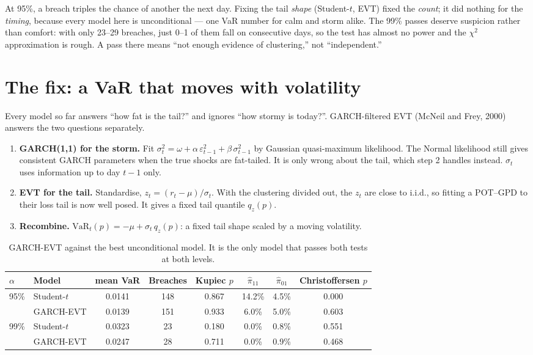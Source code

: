 \documentclass[11pt]{article}
\begin{document}
\noindent At 95\%, a breach triples the chance of another the next day. Fixing
the tail \emph{shape} (Student-$t$, EVT) fixed the \emph{count}; it did nothing
for the \emph{timing}, because every model here is unconditional --- one VaR
number for calm and storm alike. The 99\% passes deserve suspicion rather than
comfort: with only 23--29 breaches, just 0--1 of them fall on consecutive days,
so the test has almost no power and the $\chi^2$ approximation is rough. A pass
there means ``not enough evidence of clustering,'' not ``independent.''

\section{The fix: a VaR that moves with volatility}
Every model so far answers ``how fat is the tail?'' and ignores ``how stormy
is today?''. GARCH-filtered EVT (McNeil and Frey, 2000) answers the two
questions separately.
\begin{enumerate}[nosep,leftmargin=1.6em]
  \item \textbf{GARCH(1,1) for the storm.} Fit
        $\sigma_t^2=\omega+\alpha\,\varepsilon_{t-1}^2+\beta\,\sigma_{t-1}^2$
        by Gaussian quasi-maximum likelihood. The Normal likelihood still gives
        consistent GARCH parameters when the true shocks are fat-tailed. It
        is only wrong about the tail, which step 2 handles instead.
        $\sigma_t$ uses information up to day $t-1$ only.
  \item \textbf{EVT for the tail.} Standardise,
        $z_t=(r_t-\mu)/\sigma_t$. With the clustering divided out, the $z_t$
        are close to i.i.d., so fitting a POT--GPD to their loss tail is now
        well posed. It gives a fixed tail quantile $q_z(p)$.
  \item \textbf{Recombine.} $\mathrm{VaR}_t(p)=-\mu+\sigma_t\,q_z(p)$: a
        fixed tail shape scaled by a moving volatility.
\end{enumerate}

\begin{table}[h]
  \centering
  \caption{GARCH-EVT against the best unconditional model. It is the only
  model that passes both tests at both levels.}
  \label{tab:garchevt}
  \begin{tabular}{llcccccc}
    \toprule
    $\alpha$ & Model & mean VaR & Breaches & Kupiec $p$ & $\hat\pi_{11}$ & $\hat\pi_{01}$ & Christoffersen $p$\\
    \midrule
    \multirow{2}{*}{95\%}
      & Student-$t$ & 0.0141 & 148 & 0.867 & 14.2\% & 4.5\% & \textcolor{brick}{0.000}\\
      & GARCH-EVT   & 0.0139 & 151 & 0.933 & 6.0\%  & 5.0\% & 0.603\\
    \midrule
    \multirow{2}{*}{99\%}
      & Student-$t$ & 0.0323 & 23  & 0.180 & 0.0\%  & 0.8\% & 0.551\\
      & GARCH-EVT   & 0.0247 & 28  & 0.711 & 0.0\%  & 0.9\% & 0.468\\
    \bottomrule
  \end{tabular}
\end{table}
\end{document}
